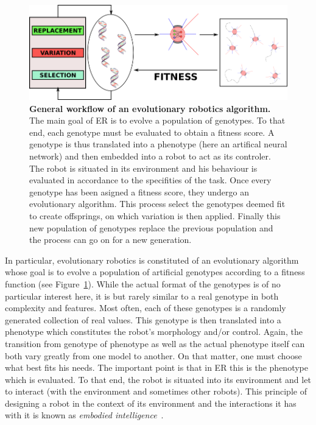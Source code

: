     \begin{figure}[hbt]
        \begin{center}
          \includegraphics[scale = 0.50]{fig/Intro/EvolutionaryRobotics.png}
          \caption{\textbf{General workflow of an evolutionary robotics algorithm.}
          The main goal of ER is to evolve a population of genotypes. To that end, each genotype must be evaluated to obtain a fitness score. A genotype is thus translated into a phenotype (here an artifical neural network) and then embedded into a robot to act as its controler. The robot is situated in its environment and his behaviour is evaluated in accordance to the specifities of the task. Once every genotype has been asigned a fitness score, they undergo an evolutionary algorithm. This process select the genotypes deemed fit to create offsprings, on which variation is then applied. Finally this new population of genotypes replace the previous population and the process can go on for a new generation.} 
          \label{fig:EvolutionaryRobotics}
        \end{center}
    \end{figure}

    In particular, evolutionary robotics is constituted of an evolutionary algorithm whose goal is to evolve a population of artificial genotypes according to a fitness function (see Figure~\ref{fig:EvolutionaryRobotics}). While the actual format of the genotypes is of no particular interest here, it is but rarely similar to a real genotype in both complexity and features. Most often, each of these genotypes is a randomly generated collection of real values. This genotype is then translated into a phenotype which constitutes the robot's morphology and/or control. Again, the transition from genotype of phenotype as well as the actual phenotype itself can both vary greatly from one model to another. On that matter, one must choose what best fits his needs. The important point is that in ER this is the phenotype which is evaluated. To that end, the robot is situated into its environment and let to interact (with the environment and sometimes other robots). This principle of designing a robot in the context of its environment and the interactions it has with it is known as \emph{embodied intelligence}~\parencite{Pfeifer2007}.
    
